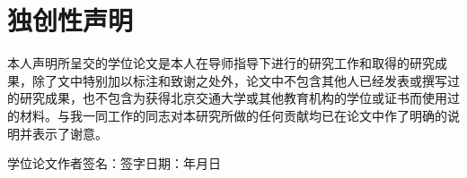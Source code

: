 \chapter*{独创性声明}
本人声明所呈交的学位论文是本人在导师指导下进行的研究工作和取得的研究成果，除了文中特别加以标注和致谢之处外，论文中不包含其他人已经发表或撰写过的研究成果，也不包含为获得北京交通大学或其他教育机构的学位或证书而使用过的材料。与我一同工作的同志对本研究所做的任何贡献均已在论文中作了明确的说明并表示了谢意。

\vspace*{3em}
学位论文作者签名：\hfill 签字日期：\hspace*{4em}年\hspace*{2em}月\hspace*{2em}日